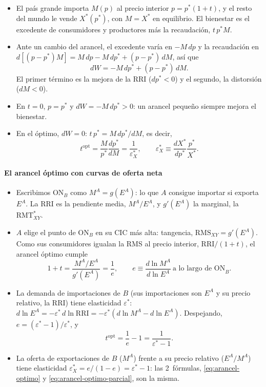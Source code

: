 \documentclass[11pt]{article}
\begin{document}
\begin{itemize}
\item El país grande importa $M(p)$ al precio interior $p=p^*(1+t)$, y el resto del mundo le vende $X^*(p^*)$, con $M=X^*$ en equilibrio. El bienestar es el excedente de consumidores y productores más la recaudación, $t\,p^*M$.
\item Ante un cambio del arancel, el excedente varía en $-M\,dp$ y la recaudación en $d[(p-p^*)M]=M\,dp-M\,dp^*+(p-p^*)\,dM$, así que
  \[
  dW=-M\,dp^*+(p-p^*)\,dM.
  \]
  El primer término es la mejora de la RRI ($dp^*<0$) y el segundo, la distorsión ($dM<0$).
\item En $t=0$, $p=p^*$ y $dW=-M\,dp^*>0$: un arancel pequeño siempre mejora el bienestar.
\item En el óptimo, $dW=0$: $t\,p^*=M\,dp^*/dM$, es decir,
  \[
  t^{\mathrm{opt}}=\frac{M}{p^*}\frac{dp^*}{dM}=\frac{1}{\varepsilon^*_X},\qquad \varepsilon^*_X\equiv\frac{dX^*}{dp^*}\frac{p^*}{X^*}.
  \]
\end{itemize}
\findemo

\paragraph{El arancel óptimo con curvas de oferta neta}

\begin{itemize}
\item Escribimos ON$_B$ como $M^A=g(E^A)$: lo que $A$ consigue importar si exporta $E^A$. La RRI es la pendiente media, $M^A/E^A$, y $g'(E^A)$ la marginal, la $\mathrm{RMT}^*_{XY}$.
\item $A$ elige el punto de ON$_B$ en su CIC más alta: tangencia, $\mathrm{RMS}_{XY}=g'(E^A)$. Como sus consumidores igualan la RMS al precio interior, $\mathrm{RRI}/(1+t)$, el arancel óptimo cumple
  \[
  1+t=\frac{M^A/E^A}{g'(E^A)}=\frac{1}{e},\qquad e\equiv\frac{d\ln M^A}{d\ln E^A}\ \text{a lo largo de ON}_B.
  \]
\item La demanda de importaciones de $B$ (sus importaciones son $E^A$ y su precio relativo, la RRI) tiene elasticidad $\varepsilon^*$: $d\ln E^A=-\varepsilon^*\,d\ln\mathrm{RRI}=-\varepsilon^*(d\ln M^A-d\ln E^A)$. Despejando, $e=(\varepsilon^*-1)/\varepsilon^*$, y
  \[
  t^{\mathrm{opt}}=\frac{1}{e}-1=\frac{1}{\varepsilon^*-1}.
  \]
\item La oferta de exportaciones de $B$ ($M^A$) frente a su precio relativo ($E^A/M^A$) tiene elasticidad $\varepsilon^*_X=e/(1-e)=\varepsilon^*-1$: las 2~fórmulas, \eqref{eq:arancel-optimo} y \eqref{eq:arancel-optimo-parcial}, son la misma.
\end{itemize}
\findemo
\end{document}
